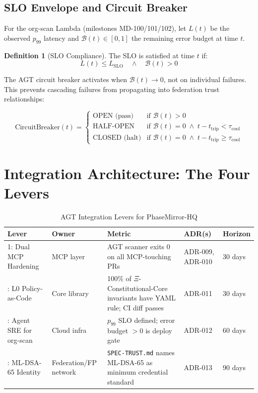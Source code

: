 \documentclass[12pt,a4paper]{article}
\theoremstyle{definition}
\newtheorem{definition}[theorem]{Definition}
\theoremstyle{remark}
\begin{document}
\subsection{SLO Envelope and Circuit Breaker}

For the org-scan Lambda (milestones MD-100/101/102), let $L(t)$ be the
observed $p_{99}$ latency and $\mathcal{B}(t) \in [0,1]$ the remaining
error budget at time $t$.

\begin{definition}[SLO Compliance]
The SLO is satisfied at time $t$ if:
\[
  L(t) \leq L_{\text{SLO}} \quad \wedge \quad \mathcal{B}(t) > 0
\]
\end{definition}

The AGT circuit breaker activates when $\mathcal{B}(t) \to 0$, not on
individual failures. This prevents cascading failures from propagating into
federation trust relationships:

\[
  \text{CircuitBreaker}(t) = \begin{cases}
    \text{OPEN (pass)} & \text{if } \mathcal{B}(t) > 0 \\
    \text{HALF-OPEN}   & \text{if } \mathcal{B}(t) = 0 \;\wedge\;
                          t - t_{\text{trip}} < \tau_{\text{cool}} \\
    \text{CLOSED (halt)} & \text{if } \mathcal{B}(t) = 0 \;\wedge\;
                            t - t_{\text{trip}} \geq \tau_{\text{cool}}
  \end{cases}
\]


\section{Integration Architecture: The Four Levers}

\begin{table}[H]
\centering
\caption{AGT Integration Levers for PhaseMirror-HQ}
\begin{tabular}{p{2.5cm} p{3.5cm} p{3.5cm} p{2cm} p{1.5cm}}
\toprule
\textbf{Lever} & \textbf{Owner} & \textbf{Metric} & \textbf{ADR(s)} & \textbf{Horizon} \\
\midrule
1: Dual MCP Hardening &
  MCP layer &
  AGT scanner exits 0 on all MCP-touching PRs &
  ADR-009, ADR-010 &
  30 days \\
\addlinespace
2: L0 Policy-as-Code &
  Core library &
  100\% of $\Xi$-Constitutional-Core invariants have YAML rule; CI diff passes &
  ADR-011 &
  30 days \\
\addlinespace
3: Agent SRE for org-scan &
  Cloud infra &
  $p_{99}$ SLO defined; error budget $>0$ is deploy gate &
  ADR-012 &
  60 days \\
\addlinespace
4: ML-DSA-65 Identity &
  Federation/FP network &
  \texttt{SPEC-TRUST.md} names ML-DSA-65 as minimum credential standard &
  ADR-013 &
  90 days \\
\bottomrule
\end{tabular}
\end{table}
\end{document}
